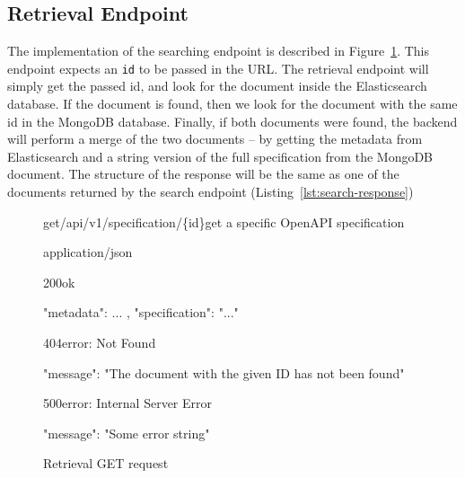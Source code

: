 \subsection{Retrieval Endpoint}\label{subsec:retrieval-endpoint}
The implementation of the searching endpoint is described in Figure~\ref{fig:retrieval-request}.
This endpoint expects an \verb|id| to be passed in the URL\@.
The retrieval endpoint will simply get the passed id, and look for the document inside the Elasticsearch database.
If the document is found, then we look for the document with the same id in the MongoDB database.
Finally, if both documents were found, the backend will perform a merge of the two documents -- by getting the metadata from Elasticsearch and a string version of the full specification from the MongoDB document.
The structure of the response will be the same as one of the documents returned by the search endpoint (Listing~\ref{lst:search-response})

\begin{figure}[!h]
    \begin{apiRoute}{get}{/api/v1/specification/\{id\}}{get a specific OpenAPI specification}
        \begin{routeParameter}
        \end{routeParameter}

        \begin{routeResponse}{application/json}
            \begin{routeResponseItem}{200}{ok}
                \begin{routeResponseItemBody}
{
    "metadata": { ... },
    "specification": "..."
}
                \end{routeResponseItemBody}
            \end{routeResponseItem}

            \begin{routeResponseItem}{404}{error: Not Found}
                \begin{routeResponseItemBody}
{
    "message": "The document with the given ID has not been found"
}
                \end{routeResponseItemBody}
            \end{routeResponseItem}

            \begin{routeResponseItem}{500}{error: Internal Server Error}
                \begin{routeResponseItemBody}
{
    "message": "Some error string"
}
                \end{routeResponseItemBody}
            \end{routeResponseItem}
        \end{routeResponse}
    \end{apiRoute}

    \caption{Retrieval GET request}
    \label{fig:retrieval-request}
\end{figure}

